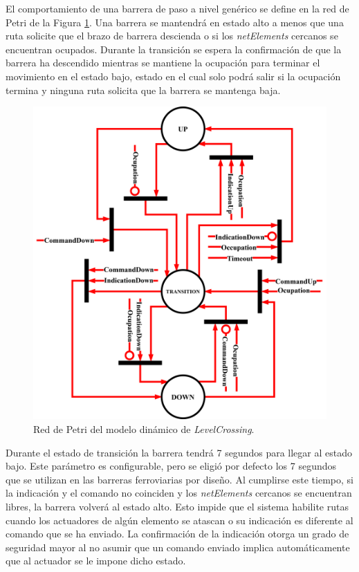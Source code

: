 	El comportamiento de una barrera de paso a nivel genérico se define en la red de Petri de la Figura \ref{fig:LCB_Petri}. Una barrera se mantendrá en estado alto a menos que una ruta solicite que el brazo de barrera descienda o si los \textit{netElements} cercanos se encuentran ocupados. Durante la transición se espera la confirmación de que la barrera ha descendido mientras se mantiene la ocupación para terminar el movimiento en el estado bajo, estado en el cual solo podrá salir si la ocupación termina y ninguna ruta solicita que la barrera se mantenga baja.
	
	\begin{figure}[H]
		\centering
		\includegraphics[width=1\textwidth]{Figuras/LCB_petri}
		\centering\caption{Red de Petri del modelo dinámico de \textit{LevelCrossing}.}
		\label{fig:LCB_Petri}
	\end{figure}
	
	Durante el estado de transición la barrera tendrá 7 segundos para llegar al estado bajo. Este parámetro es configurable, pero se eligió por defecto los 7 segundos que se utilizan en las barreras ferroviarias por diseño. Al cumplirse este tiempo, si la indicación y el comando no coinciden y los \textit{netElements} cercanos se encuentran libres, la barrera volverá al estado alto. Esto impide que el sistema habilite rutas cuando los actuadores de algún elemento se atascan o su indicación es diferente al comando que se ha enviado. La confirmación de la indicación otorga un grado de seguridad mayor al no asumir que un comando enviado implica automáticamente que al actuador se le impone dicho estado.